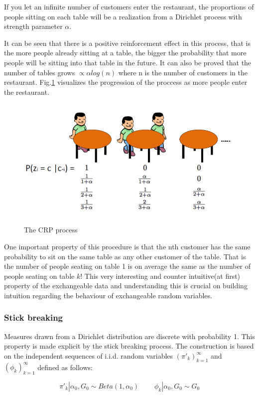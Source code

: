 \documentclass[twoside,hidelinks]{article}
\begin{document}
If you let an infinite number of customers enter the restaurant, the proportions of people sitting on each table will be a realization from a Dirichlet process with strength parameter $\alpha$.

It can be seen that there is a positive reinforcement effect in this process, that is the more people already sitting at a table, the bigger the probability that more people will be sitting into that table in the future. It can also be proved that the number of tables grows $ \propto \alpha log(n)$ where n is the number of customers in the restaurant. Fig.\ref{CRP} visualizes the progression of the proccess as more people enter the restaurant. 

\begin{figure}[!h]
          \centerline{\includegraphics[width=.70\textwidth]{crp}}
	\caption{The CRP process}
	\label{CRP}
\end{figure}


One important property of this procedure is that the nth customer has the same probability to sit on the same table as any other customer of the table. That is the number of people seating on table 1 is on average the same as the number of people seating on table $k$! This very interesting and counter intuitive(at first) property of the exchangeable data and understanding this is crucial on building intuition regarding the behaviour of exchangeable random variables.


\subsubsection{Stick breaking}

Measures drawn from a Dirichlet distribution are discrete with probability 1. This property is made explicit by the stick breaking process. The construction is based on the independent sequences of i.i.d. random variables $(\pi'_k)_{k=1}^\infty$ and $ ( \phi_k)_{k=1}^\infty$  defined as follows:


  \begin{equation}
\pi'_k  | \alpha_0, G_0 \sim Beta(1, \alpha_0)\ \ \ \ \ \ \ \ \ \   \phi_k | \alpha_0, G_0 \sim G_0
\end{equation}
\end{document}
